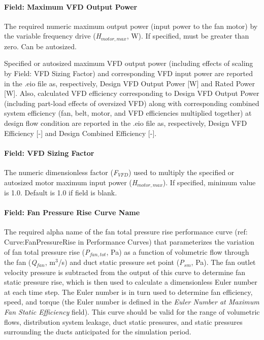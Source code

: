 \paragraph{Field: Maximum VFD Output Power}\label{field-maximum-vfd-output-power}

The required numeric maximum output power (input power to the fan motor) by the variable frequency drive (\emph{H\(_{motor,max}\)}, W). If specified, must be greater than zero. Can be autosized.

Specified or autosized maximum VFD output power (including effects of scaling by Field: VFD Sizing Factor) and corresponding VFD input power are reported in the .eio file as, respectively, Design VFD Output Power {[}W{]} and Rated Power {[}W{]}. Also, calculated VFD efficiency corresponding to Design VFD Output Power (including part-load effects of oversized VFD) along with corresponding combined system efficiency (fan, belt, motor, and VFD efficiencies multiplied together) at design flow condition are reported in the .eio file as, respectively, Design VFD Efficiency {[}-{]} and Design Combined Efficiency {[}-{]}.

\paragraph{Field: VFD Sizing Factor}\label{field-vfd-sizing-factor}

The numeric dimensionless factor (\emph{F\(_{VFD}\)}) used to multiply the specified or autosized motor maximum input power (\emph{H\(_{motor,max}\)}). If specified, minimum value is 1.0. Default is 1.0 if field is blank.

\paragraph{Field: Fan Pressure Rise Curve Name}\label{field-fan-pressure-rise-curve-name}

The required alpha name of the fan total pressure rise performance curve (ref: Curve:FanPressureRise in Performance Curves) that parameterizes the variation of fan total pressure rise (\emph{P\(_{fan,tot}\)}, Pa) as a function of volumetric flow through the fan (\emph{Q\(_{fan}\)}, m\(^{3}\)/s) and duct static pressure set point (\emph{P\(_{sm}\)}, Pa). The fan outlet velocity pressure is subtracted from the output of this curve to determine fan static pressure rise, which is then used to calculate a dimensionless Euler number at each time step. The Euler number is in turn used to determine fan efficiency, speed, and torque (the Euler number is defined in the \emph{Euler Number at Maximum Fan Static Efficiency} field). This curve should be valid for the range of volumetric flows, distribution system leakage, duct static pressures, and static pressures surrounding the ducts anticipated for the simulation period.

